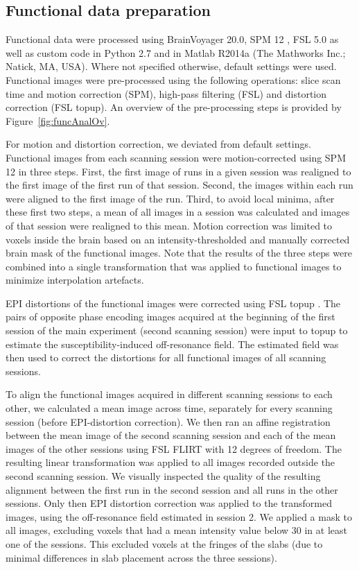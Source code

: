 \subsection{Functional data preparation}
Functional data were processed using BrainVoyager 20.0, SPM 12 \parencite{Friston2006}, FSL 5.0 \parencite{Jenkinson2012} as well as custom code in Python 2.7 \parencite{numpy2011, scipy2001, matplotlib2007} and in Matlab R2014a (The Mathworks Inc.; Natick, MA, USA). Where not specified otherwise, default settings were used. Functional images were pre-processed using the following operations: slice scan time and motion correction (SPM), high-pass filtering (FSL) and distortion correction (FSL topup). An overview of the pre-processing steps is provided by Figure~\ref{fig:funcAnalOv}.

For motion and distortion correction, we deviated from default settings. Functional images from each scanning session were motion-corrected using SPM 12 in three steps. First, the first image of runs in a given session was realigned to the first image of the first run of that session. Second, the images within each run were aligned to the first image of the run. Third, to avoid local minima, after these first two steps, a mean of all images in a session was calculated and images of that session were realigned to this mean. Motion correction was limited to voxels inside the brain based on an intensity-thresholded and manually corrected brain mask of the functional images. Note that the results of the three steps were combined into a single transformation that was applied to functional images to minimize interpolation artefacts.

EPI distortions of the functional images were corrected using FSL topup \parencite{Andersson2003, Smith2004}. The pairs of opposite phase encoding images acquired at the beginning of the first session of the main experiment (second scanning session) were input to topup to estimate the susceptibility-induced off-resonance field. The estimated field was then used to correct the distortions for all functional images of all scanning sessions.

To align the functional images acquired in different scanning sessions to each other, we calculated a mean image across time, separately for every scanning session (before EPI-distortion correction). We then ran an affine registration between the mean image of the second scanning session and each of the mean images of the other sessions using FSL FLIRT \parencite{Jenkinson2001, Jenkinson2002} with 12 degrees of freedom. The resulting linear transformation was applied to all images recorded outside the second scanning session. We visually inspected the quality of the resulting alignment between the first run in the second session and all runs in the other sessions. Only then EPI distortion correction was applied to the transformed images, using the off-resonance field estimated in session 2. We applied a mask to all images, excluding voxels that had a mean intensity value below 30 in at least one of the sessions. This excluded voxels at the fringes of the slabs (due to minimal differences in slab placement across the three sessions).


